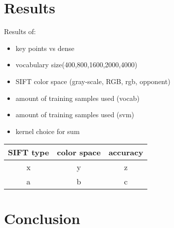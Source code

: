 \documentclass[12pt,a4paper]{amsart}
\begin{document}
\section{Results}
Results of:\\
\begin{itemize}
\item key points vs dense
\item vocabulary size(400,800,1600,2000,4000)
\item SIFT color space (gray-scale, RGB, rgb, opponent)
\item amount of training samples used (vocab)
\item amount of training samples used (svm)
\item kernel choice for sum
\end{itemize}
\begin{tabular}{|c|c|c|}
\hline
SIFT type & color space & accuracy \\
\hline
x & y & z\\
a & b & c\\
\hline
\end{tabular}
\section{Conclusion}
\end{document}
